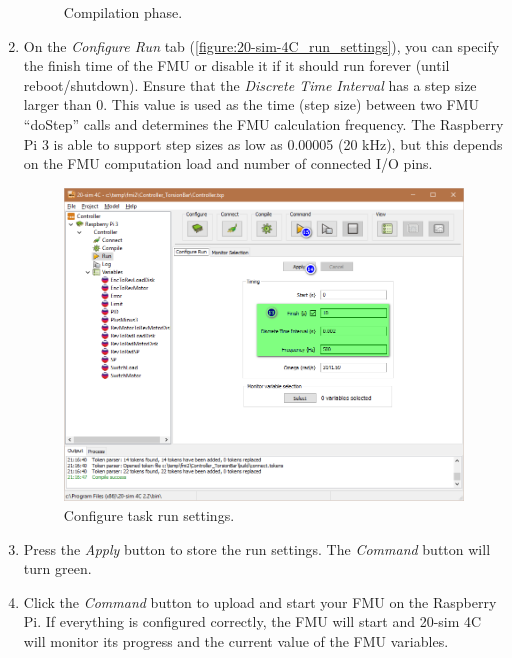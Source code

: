 \begin{enumerate}
\begin{figure}[hpt]
	\caption{Compilation phase.}
	\label{figure:20-sim-4C_compile}
\end{figure}
%
\item On the \textit{Configure Run} tab (\autoref{figure:20-sim-4C_run_settings}), you can specify the finish time of the FMU or disable it if it should run forever (until reboot/shutdown).  Ensure that the \textit{Discrete Time Interval} has a step size larger than 0.  This value is used as the time (step size) between two FMU ``doStep'' calls and determines the FMU calculation frequency.  The Raspberry Pi 3 is able to support step sizes as low as 0.00005 (20 kHz), but this depends on the FMU computation load and number of connected I/O pins.
%
\begin{figure}[hpt]
	\centerline{\includegraphics[width=\textwidth]{figures/20-sim-4C_run_settings.png}}
	\caption{Configure task run settings.}
	\label{figure:20-sim-4C_run_settings}
\end{figure}
%
\item Press the \textit{Apply} button to store the run settings.  The \textit{Command} button will turn green.
%
\item Click the \textit{Command} button to upload and start your FMU on the Raspberry Pi.  If everything is configured correctly, the FMU will start and 20-sim 4C will monitor its progress and the current value of the FMU variables.
%
\begin{figure}[hpt]

\end{figure}
\end{enumerate}
